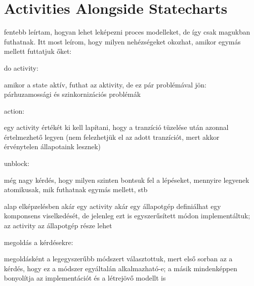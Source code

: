 \section{Activities Alongside Statecharts}

fentebb leírtam, hogyan lehet leképezni proces modelleket, de így csak magukban futhatnak. Itt most leírom, hogy milyen nehézségeket okozhat, amikor egymás mellett futtatjuk őket:

do activity:

amikor a state aktív, futhat az aktivity, de ez pár problémával jön: párhuzamossági és szinkornizációs problémák

action:

egy activity értékét ki kell lapítani, hogy a tranzíció tüzelése után azonnal értelmezhető legyen (nem felezhetjük el az adott tranzíciót, mert akkor érvénytelen állapotaink lesznek)

unblock:

még nagy kérdés, hogy milyen szinten bontsuk fel a lépéseket, mennyire legyenek atomikusak, mik futhatnak egymás mellett, stb

alap elképzelésben akár egy activity akár egy állapotgép definiálhat egy komponsens viselkedését, de jelenleg ezt is egyszerűsített módon implementáltuk; az activity az állapotgép része lehet

megoldás a kérdésekre:

megoldásként a legegyszerűbb módszert választottuk, mert első sorban az a kérdés, hogy ez a módszer egyáltalán alkalmazható-e; a másik mindenképpen bonyolítja az implementációt és a létrejövő modellt is

